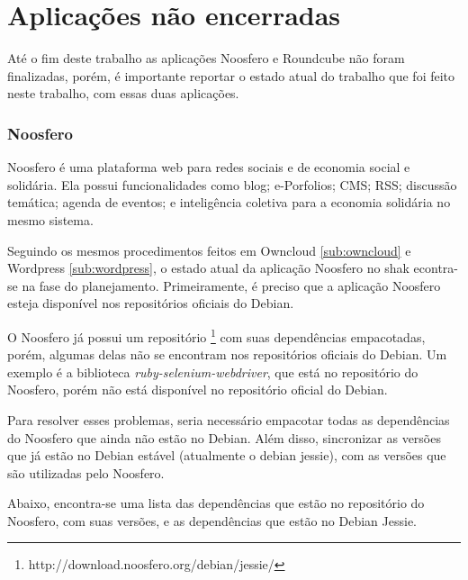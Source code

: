 \section{Aplicações não encerradas}
\label{sub:appnencerradas}

Até o fim deste trabalho as aplicações Noosfero e Roundcube não foram finalizadas,
porém, é importante reportar o estado atual do trabalho que foi feito neste trabalho,
com essas duas aplicações.

\subsubsection{Noosfero}
\label{subsub:noosfero}

Noosfero  é uma plataforma web para redes sociais e 
de economia social e solidária. Ela possui funcionalidades como blog; e-Porfolios; 
CMS; RSS; discussão temática; agenda de eventos; e inteligência coletiva para a 
economia solidária no mesmo sistema.

Seguindo os mesmos procedimentos feitos em Owncloud \ref{sub:owncloud} e 
Wordpress \ref{sub:wordpress}, o estado atual da aplicação Noosfero no shak econtra-se
na fase do planejamento. Primeiramente, é preciso que a aplicação Noosfero esteja
disponível nos repositórios oficiais do Debian.

O Noosfero já possui um repositório \footnote{http://download.noosfero.org/debian/jessie/}
com suas dependências empacotadas, porém, algumas delas não se encontram nos repositórios
oficiais do Debian. Um exemplo é a biblioteca \textit{ruby-selenium-webdriver}, que
está no repositório do Noosfero, porém não está disponível no repositório oficial
do Debian.

Para resolver esses problemas, seria necessário empacotar todas as dependências
do Noosfero que ainda não estão no Debian. Além disso, sincronizar as versões
que já estão no Debian estável (atualmente o debian jessie), com as versões
que são utilizadas pelo Noosfero.

Abaixo, encontra-se uma lista das dependências que estão no repositório do Noosfero,
com suas versões, e as dependências que estão no Debian Jessie.

